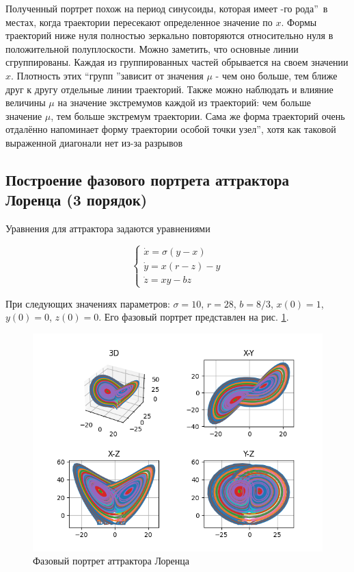 Полученный портрет похож на период синусоиды, которая имеет -го рода\textquotedblright\
в местах, когда траектории пересекают определенное значение по $x$. Формы траекторий ниже нуля полностью зеркально повторяются относительно нуля в положительной полуплоскости.
Можно заметить, что основные линии сгруппированы. Каждая из группированных частей обрывается на своем значении $x$. Плотность этих \textquotedblleft групп \textquotedblright зависит от значения $\mu$ - 
чем оно больше, тем ближе друг к другу отдельные линии траекторий. Также можно наблюдать и влияние величины $\mu$ на значение экстремумов
каждой из траекторий: чем больше значение $\mu$, тем больше экстремум траектории. Сама же форма траекторий очень отдалённо напоминает
форму траектории особой точки \textquotedblleftустойчивый узел\textquotedblright, хотя как таковой выраженной диагонали нет из-за
разрывов

\subsection{Построение фазового портрета аттрактора Лоренца (3 порядок)}

Уравнения для аттрактора задаются уравнениями

$$
\begin{cases}
    \dot x = \sigma (y-x) \\
    \dot y = x (r - z) - y \\
    \dot z = xy - bz
\end{cases}
$$

При следующих значениях параметров: $\sigma = 10$, $r = 28$, $b = 8/3$, $x(0) = 1$, $y(0) = 0$, $z(0) = 0$.
Его фазовый портрет представлен на рис. \ref{fig:20}.

\begin{figure}[H]
	\centering
	\includegraphics[width=0.7\linewidth]{body/images/Lorenz-attractor-type-1.png}
	\caption{Фазовый портрет аттрактора Лоренца}
	\label{fig:20}
\end{figure}

